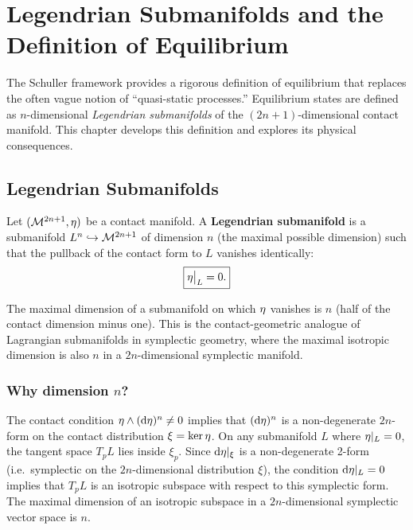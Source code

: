 \chapter{Legendrian Submanifolds and the Definition of Equilibrium}

The Schuller framework provides a rigorous definition of equilibrium that replaces the often vague notion of ``quasi-static processes.'' Equilibrium states are defined as $n$-dimensional \emph{Legendrian submanifolds} of the $(2n+1)$-dimensional contact manifold. This chapter develops this definition and explores its physical consequences.

\section{Legendrian Submanifolds}

\begin{definition}
Let $(\mathcal{M}^{2n+1}, \eta)$ be a contact manifold. A \textbf{Legendrian submanifold} is a submanifold $L^n \hookrightarrow \mathcal{M}^{2n+1}$ of dimension $n$ (the maximal possible dimension) such that the pullback of the contact form to $L$ vanishes identically:
\begin{equation}
\boxed{\eta\big|_L = 0.}
\end{equation}
\end{definition}

\begin{remark}
The maximal dimension of a submanifold on which $\eta$ vanishes is $n$ (half of the contact dimension minus one). This is the contact-geometric analogue of Lagrangian submanifolds in symplectic geometry, where the maximal isotropic dimension is also $n$ in a $2n$-dimensional symplectic manifold.
\end{remark}

\subsection{Why dimension $n$?}

The contact condition $\eta \wedge (\dd\eta)^n \neq 0$ implies that $(\dd\eta)^n$ is a non-degenerate $2n$-form on the contact distribution $\xi = \ker\eta$. On any submanifold $L$ where $\eta|_L = 0$, the tangent space $T_pL$ lies inside $\xi_p$. Since $\dd\eta|_\xi$ is a non-degenerate 2-form (i.e.\ symplectic on the $2n$-dimensional distribution $\xi$), the condition $\dd\eta|_L = 0$ implies that $T_pL$ is an isotropic subspace with respect to this symplectic form. The maximal dimension of an isotropic subspace in a $2n$-dimensional symplectic vector space is $n$.

